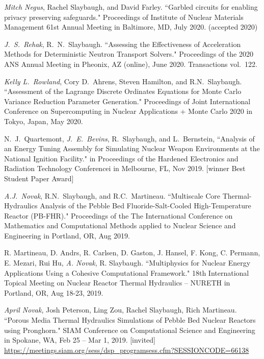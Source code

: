 \begin{bibsection}
\item \textit{Mitch Negus}, Rachel Slaybaugh, and David Farley. ``Garbled
circuits for enabling privacy preserving safeguards." Proceedings of Institute
of Nuclear Materials Management 61st Annual Meeting in Baltimore, MD, July 2020.
(accepted 2020) 

\item \textit{J.\ S.\ Rehak}, R.\ N.\ Slaybaugh. ``Assessing the Effectiveness
of Acceleration Methods for Deterministic Neutron Transport Solvers."
Proceedings of  the 2020 ANS Annual Meeting in Pheonix, AZ (online), June 2020.
Transactions vol.\ 122.

\item \textit{Kelly L.\ Rowland}, Cory D.\ Ahrens, Steven Hamilton, and R.N.\
Slaybaugh. ``Assessment of the Lagrange Discrete Ordinates Equations for Monte
Carlo Variance Reduction Parameter Generation." Proceedings of Joint
International Conference on Supercomputing in Nuclear Applications + Monte Carlo
2020 in Tokyo, Japan, May 2020. 

\item N.\ J.\ Quartemont, \textit{J.\ E.\ Bevins}, R.\ Slaybaugh, and L.\ Bernstein, ``Analysis
of an Energy Tuning Assembly for Simulating Nuclear Weapon Environments at the
National Ignition Facility." in Proceedings of the Hardened Electronics and
Radiation Technology Conferencei in Melbourne, FL, Nov 2019. [winner Best Student Paper Award]

\item \textit{A.J.\ Novak}, R.N.\ Slaybaugh, and R.C.\ Martineau. ``Multiscale
Core Thermal-Hydraulics Analysis of the Pebble Bed Fluoride-Salt-Cooled
High-Temperature Reactor (PB-FHR)." Proceedings of the The International
Conference on Mathematics and Computational Methods applied to Nuclear Science
and Engineering in Portland, OR, Aug 2019. 

\item R. Martineau, D. Andrs, R. Carlsen, D. Gaston, J. Hansel, F. Kong, C. Permann, E. Mezari, Rui Hu, \textit{A. Novak}, R. Slaybaugh. ``Multiphysics for Nuclear Energy Applications Using a Cohesive Computational Framework." 18th International Topical Meeting on Nuclear Reactor Thermal Hydraulics – NURETH in Portland, OR, Aug 18-23, 2019. 

\item \textit{April Novak}, Josh Peterson, Ling Zou, Rachel Slaybaugh, Rich Martineau. ``Porous Media Thermal Hydraulics Simulations of Pebble Bed Nuclear Reactors using Pronghorn." SIAM Conference on Computational Science and Engineering in Spokane, WA, Feb 25 – Mar 1, 2019. [invited]\\
\url{https://meetings.siam.org/sess/dsp_programsess.cfm?SESSIONCODE=66138}


\end{bibsection}
